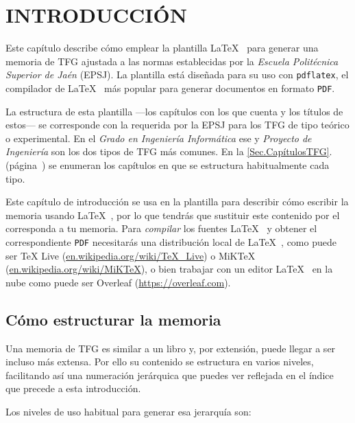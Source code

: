 
\chapter{INTRODUCCIÓN}  

Este capítulo describe cómo emplear la plantilla \LaTeX~ para generar una memoria de TFG ajustada a las normas establecidas por la \textit{Escuela Politécnica Superior de Jaén} (EPSJ). La plantilla está diseñada para su uso con \verb*|pdflatex|, el compilador de \LaTeX~ más popular para generar documentos en formato \verb*|PDF|.

La estructura de esta plantilla ---los capítulos con los que cuenta y los títulos de estos--- se corresponde con la requerida por la EPSJ para los TFG de tipo teórico o experimental. En el \textit{Grado en Ingeniería Informática} ese y \textit{Proyecto de Ingeniería} son los dos tipos de TFG más comunes. En la \autoref{Sec.CapítulosTFG}.~ (página~\pageref{Sec.CapítulosTFG}) se enumeran los capítulos en que se estructura habitualmente cada tipo.

Este capítulo de introducción se usa en la plantilla para describir cómo escribir la memoria usando \LaTeX~, por lo que tendrás que sustituir este contenido por el corresponda a tu memoria. Para \textit{compilar} los fuentes \LaTeX~ y obtener el correspondiente \verb*|PDF| necesitarás una distribución local de \LaTeX~, como puede ser TeX Live (\url{en.wikipedia.org/wiki/TeX\_Live}) o MiKTeX (\url{en.wikipedia.org/wiki/MiKTeX}), o bien trabajar con un editor \LaTeX~ en la nube como puede ser Overleaf (\url{https://overleaf.com}).

\section{Cómo estructurar la memoria}

Una memoria de TFG es similar a un libro y, por extensión, puede llegar a ser incluso más extensa. Por ello su contenido se estructura en varios niveles, facilitando así una numeración jerárquica que puedes ver reflejada en el índice que precede a esta introducción. 

Los niveles de uso habitual para generar esa jerarquía son:

